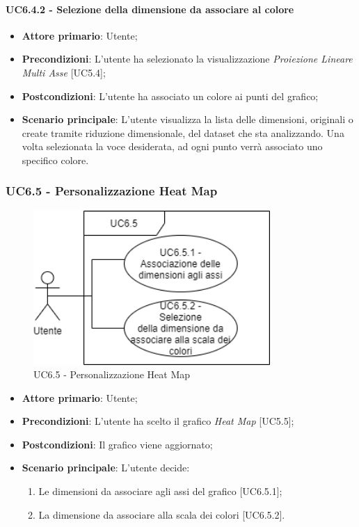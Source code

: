 \paragraph{UC6.4.2 - Selezione della dimensione da associare al colore}
\begin{itemize}
	\item \textbf{Attore primario}: Utente;
	\item \textbf{Precondizioni}: L'utente ha selezionato la visualizzazione \textit{Proiezione Lineare Multi Asse} [UC5.4];
	\item \textbf{Postcondizioni}: L'utente ha associato un colore ai punti del grafico;
	
	\item \textbf{Scenario principale}: L'utente visualizza la lista delle dimensioni, originali o create tramite riduzione dimensionale, del dataset che sta analizzando. Una volta selezionata la voce desiderata, ad ogni punto verrà associato uno specifico colore. 
\end{itemize}

\subsubsection{UC6.5 - Personalizzazione Heat Map}
\begin{figure}[h]
\includegraphics[width=9cm]{Section/Images/UC6.5.png}
\centering
\caption{UC6.5 - Personalizzazione Heat Map}
\end{figure}
\begin{itemize}
	\item \textbf{Attore primario}: Utente;
	
	\item \textbf{Precondizioni}: L'utente ha scelto il grafico \textit{Heat Map} [UC5.5];
	
	\item \textbf{Postcondizioni}: Il grafico viene aggiornato;
	
	\item \textbf{Scenario principale}: L'utente decide:
	
\begin{enumerate}
\item Le dimensioni da associare agli assi del grafico [UC6.5.1];
\item La dimensione da associare alla scala dei colori [UC6.5.2].
\end{enumerate}	
		
\end{itemize}

